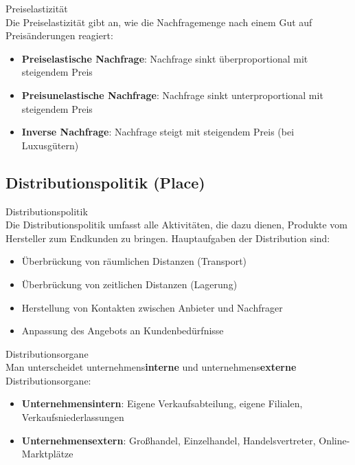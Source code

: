 \begin{definition}{Preiselastizität}\\
Die Preiselastizität gibt an, wie die Nachfragemenge nach einem Gut auf Preisänderungen reagiert:
\begin{itemize}
    \item \textbf{Preiselastische Nachfrage}: Nachfrage sinkt überproportional mit steigendem Preis
    \item \textbf{Preisunelastische Nachfrage}: Nachfrage sinkt unterproportional mit steigendem Preis
    \item \textbf{Inverse Nachfrage}: Nachfrage steigt mit steigendem Preis (bei Luxusgütern)
\end{itemize}
\end{definition}

\subsection{Distributionspolitik (Place)}

\begin{definition}{Distributionspolitik}\\
Die Distributionspolitik umfasst alle Aktivitäten, die dazu dienen, Produkte vom Hersteller zum Endkunden zu bringen. Hauptaufgaben der Distribution sind:
\begin{itemize}
    \item Überbrückung von räumlichen Distanzen (Transport)
    \item Überbrückung von zeitlichen Distanzen (Lagerung)
    \item Herstellung von Kontakten zwischen Anbieter und Nachfrager
    \item Anpassung des Angebots an Kundenbedürfnisse
\end{itemize}
\end{definition}

\begin{definition}{Distributionsorgane}\\
Man unterscheidet unternehmens\textbf{interne} und unternehmens\textbf{externe} Distributionsorgane:
\begin{itemize}
    \item \textbf{Unternehmensintern}: Eigene Verkaufsabteilung, eigene Filialen, Verkaufsniederlassungen
    \item \textbf{Unternehmensextern}: Großhandel, Einzelhandel, Handelsvertreter, Online-Marktplätze
\end{itemize}
\end{definition}

